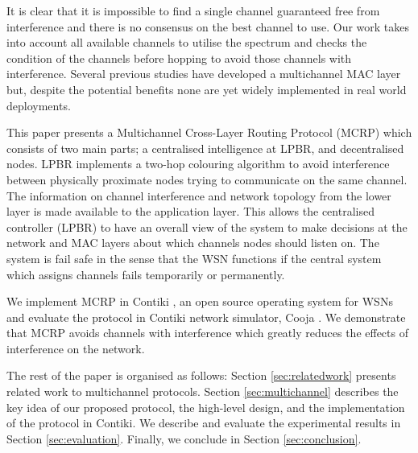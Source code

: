 It is clear that it is impossible to find a single channel guaranteed free from interference and there is no consensus on the best channel to use. Our work takes into account all available channels to utilise the spectrum and checks the condition of the channels before hopping to avoid those channels with interference. Several previous studies have developed a multichannel MAC layer but, despite the potential benefits none are yet widely implemented in real world deployments.

This paper presents a Multichannel Cross-Layer Routing Protocol (MCRP) which consists of two main parts; a centralised intelligence at LPBR, and decentralised nodes. LPBR implements a two-hop colouring algorithm to avoid interference between physically proximate nodes trying to communicate on the same channel. The information on channel interference and network topology from the lower layer is made available to the application layer. This allows the centralised controller (LPBR) to have an overall view of the system to make decisions at the network and MAC layers about which channels nodes should listen on. The system is fail safe in the sense that the WSN functions if the central system which assigns channels fails temporarily or permanently.

We implement MCRP in Contiki \cite{contiki}, an open source operating system for WSNs and evaluate the protocol in Contiki network simulator, Cooja \cite{cooja}. 
We demonstrate that MCRP avoids channels with interference which greatly reduces the effects of interference on the network.

The rest of the paper is organised as follows: Section \ref{sec:relatedwork} presents related work to multichannel protocols. Section \ref{sec:multichannel} describes the key idea of our proposed protocol, the high-level design, and the implementation of the protocol in Contiki. We describe and evaluate the experimental results in Section \ref{sec:evaluation}. Finally, we conclude in Section \ref{sec:conclusion}.
